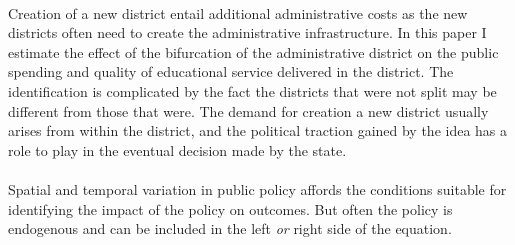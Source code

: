 \documentclass[12pt, a4paper]{article}
\begin{document}
\paragraph{} Creation of a new district entail additional administrative costs as the new districts often need to create the administrative infrastructure. In this paper I estimate the effect of the bifurcation of the administrative district on the public spending and quality of educational service delivered in the district. The identification is complicated by the fact the districts that were not split may be different from those that were. The demand for creation a new district usually arises from within the district, and the political traction gained by the idea has a role to play in the eventual decision made by the state. 
\paragraph{} Spatial and temporal variation in public policy affords the conditions suitable for identifying the impact of the policy on outcomes. But often the policy is endogenous and can be included in the left \textit{or} right side of the equation. 
\printbibliography
\end{document}
